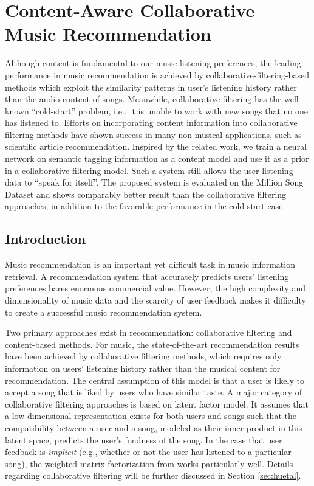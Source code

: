 

\chapter{Content-Aware Collaborative Music Recommendation}\label{chpt:content}


Although content is fundamental to our music listening preferences, the leading performance in music recommendation is achieved by collaborative-filtering-based methods which exploit the similarity patterns in user's listening history rather than the audio content of songs. Meanwhile, collaborative filtering has the well-known ``cold-start'' problem, i.e., it is unable to work with new songs that no one has listened to.  Efforts on incorporating content information into collaborative filtering methods have shown success in many non-musical applications, such as scientific article recommendation. Inspired by the related work, we train a neural network on semantic tagging information as a content model and use it as a prior in a collaborative filtering model. Such a system still allows the user listening data to ``speak for itself''. The proposed system is evaluated on the Million Song Dataset and shows comparably better result than the collaborative filtering approaches, in addition to the favorable performance in the cold-start case. 

%
\section{Introduction}\label{chpt:content:sec:intro}
Music recommendation is an important yet difficult task in music information retrieval. A recommendation system that accurately predicts users' listening preferences bares enormous commercial value. However, the high complexity and dimensionality of music data and the scarcity of user feedback makes it difficulty to create a successful music recommendation system. 

Two primary approaches exist in recommendation: collaborative filtering and content-based methods. For music, the state-of-the-art recommendation results have been achieved by collaborative filtering methods, which requires only information on users' listening history rather than the musical content for recommendation. The central assumption of this model is that a user is likely to accept a song that is liked by users who have similar taste.  A major category of collaborative filtering approaches is based on latent factor model. It assumes that a low-dimensional representation exists for both users and songs such that the compatibility between a user and a song, modeled as their inner product in this latent space, predicts the user's fondness of the song. In the case that user feedback is \emph{implicit} (e.g., whether or not the user has listened to a particular song), the weighted matrix factorization from \citet{hu2008collaborative} works particularly well. Details regarding collaborative filtering will be further discussed in Section \ref{sec:huetal}. 

